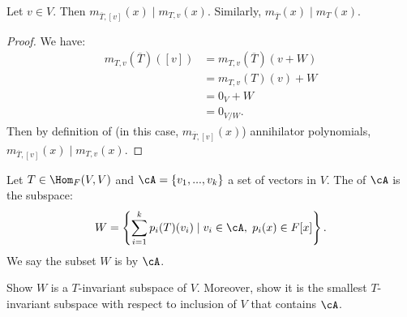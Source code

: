     \begin{lemma}
        Let $v \in V$. Then $m_{\overline{T},[v]}(x) \mid m_{T,v}(x)$. Similarly, $m_{\overline{T}}(x) \mid m_T(x)$.
    \end{lemma}
        \begin{proof}
            We have:
                \begin{equation*}
                \begin{split}
                    m_{T,v}(\overline{T})([v])
                    & = m_{T,v}(\overline{T})(v+W) \\
                    & = m_{T,v}(T)(v) + W \\
                    & = 0_V + W \\
                    & = 0_{V/W}.
                \end{split}
                \end{equation*}
            Then by definition of (in this case, $m_{\overline{T},[v]}(x)$) annihilator polynomials, $m_{\overline{T},[v]}(x) \mid m_{T,v}(x)$.
        \end{proof}

    \begin{definition}
        Let $T \in \Hom_F(V,V)$ and $\cA = \{v_1,...,v_k\}$ a set of vectors in $V$. The  of $\cA$ is the subspace:
            \begin{equation*}
            \begin{split}
                W = \left\{\sum_{i=1}^k p_i(T)(v_i) \mid v_i \in \cA, \hspace{3pt}p_i(x) \in F[x]\right\}.
            \end{split}
            \end{equation*}
        We say the subset $W$ is  by $\cA$.
    \end{definition}

    \begin{exercise}\label{exercise:t-span}
        Show $W$ is a $T$-invariant subspace of $V$. Moreover, show it is the smallest $T$-invariant subspace with respect to inclusion of $V$ that contains $\cA$.
    \end{exercise}

